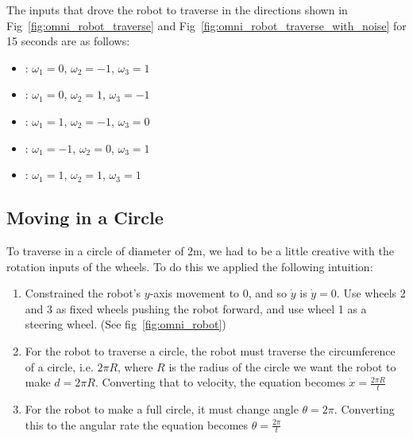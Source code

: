 \documentclass{article}
\begin{document}
The inputs that drove the robot to traverse in the directions shown in 
Fig~\ref{fig:omni_robot_traverse} and 
Fig~\ref{fig:omni_robot_traverse_with_noise}  for 15 
seconds  are as follows:


\begin{itemize}
	\vspace{-0.4cm}
	\setlength{\itemsep}{0pt}
	\setlength{\parskip}{0pt}
	\setlength{\parsep}{0pt}
	
	\item{
		: 
		$\omega_{1} = 0$, $\omega_{2} = -1$, $\omega_{3} = 1$
	}
	\item{
		: 
		$\omega_{1} = 0$, $\omega_{2} = 1$, $\omega_{3} = -1$
	}
	\item{
		: 
		$\omega_{1} = 1$, $\omega_{2} = -1$, $\omega_{3} = 0$
	}
	\item{
		: 
		$\omega_{1} = -1$, $\omega_{2} = 0$, $\omega_{3} = 1$
	}
	\item{
		: 
		$\omega_{1} = 1$, $\omega_{2} = 1$, $\omega_{3} = 1$
	}
\end{itemize}



\newpage
\subsection{Moving in a Circle}
\label{subsec:traverse_circle}

To traverse in a circle of diameter of $2$m, we had to be a little creative
with the rotation inputs of the wheels. To do this we applied the following 
intuition:

\begin{enumerate}
	\vspace{-0.4cm}
	
    \item{Constrained the robot's $y$-axis movement to $0$, 
    and so $\dot{y}$ is $\dot{y} = 0$. Use wheels 2 and 3 as fixed wheels 
    pushing the robot forward, and use wheel 1 as a steering wheel. (See 
    fig~\ref{fig:omni_robot})}

    \item{For the robot to traverse a circle, the robot must traverse the
    circumference of a circle, i.e. $2 \pi R$, where $R$ is the radius of the 
    circle we want the robot to make $d = 2 \pi R$. Converting that to 
    velocity, the equation becomes $\dot{x} = \frac{2 \pi R}{t}$}

    \item{For the robot to make a full circle, it must change angle $\theta = 2 
    \pi$. Converting this to the angular rate the equation becomes 
    $\theta = \frac{2 \pi}{t}$}
    
   	\vspace{-0.4cm}
\end{enumerate}
\end{document}
